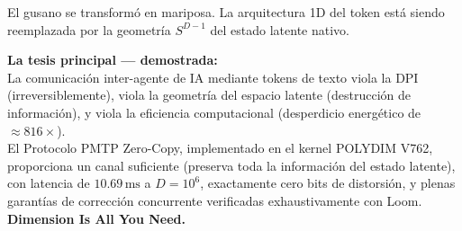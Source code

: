 El gusano se transformó en mariposa. La arquitectura 1D del token está siendo
reemplazada por la geometría $S^{D-1}$ del estado latente nativo.

\begin{polydimbox}
\textbf{La tesis principal --- demostrada:}\\[0.5cm]
La comunicación inter-agente de IA mediante tokens de texto viola la DPI
(irreversiblemente), viola la geometría del espacio latente (destrucción de información),
y viola la eficiencia computacional (desperdicio energético de $\approx 816\times$).\\[0.3cm]
El Protocolo PMTP Zero-Copy, implementado en el kernel POLYDIM V762,
proporciona un canal suficiente (preserva toda la información del estado latente),
con latencia de $10.69\,\text{ms}$ a $D=10^6$, exactamente cero bits de distorsión,
y plenas garantías de corrección concurrente verificadas exhaustivamente con Loom.\\[0.3cm]
\textbf{Dimension Is All You Need.}
\end{polydimbox}
